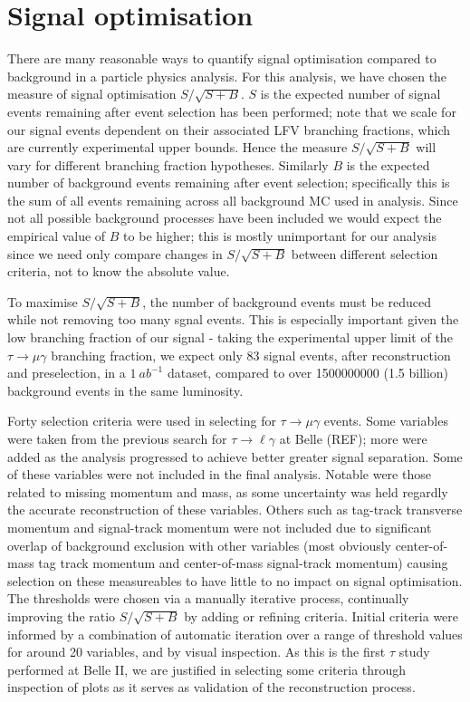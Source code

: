 \documentclass[12pt]{thesis}  %
\begin{document}

\chapter{Signal optimisation}

There are many reasonable ways to quantify signal optimisation compared to background in a particle physics analysis. For this analysis, we have chosen the measure of signal optimisation $S/\sqrt{S+B}$. $S$ is the expected number of signal events remaining after event selection has been performed; note that we scale for our signal events dependent on their associated LFV branching fractions, which are currently experimental upper bounds. Hence the measure $S/\sqrt{S+B}$ will vary for different branching fraction hypotheses. 
Similarly $B$ is the expected number of background events remaining after event selection; specifically this is the sum of all events remaining across all background MC used in analysis. Since not all possible background processes have been included we would expect the empirical value of $B$ to be higher; this is mostly unimportant for our analysis since we need only compare changes in $S/\sqrt{S+B}$ between different selection criteria, not to know the absolute value.

To maximise $S/\sqrt{S+B}$, the number of background events must be reduced while not removing too many sgnal events. This is especially important given the low branching fraction of our signal - taking the experimental upper limit of the $\tau\to\mu\gamma$ branching fraction, we expect only 83 signal events, after reconstruction and preselection, in a $\SI{1}{ab^{-1}}$ dataset, compared to over \num{1500000000} (1.5 billion) background events in the same luminosity.

Forty selection criteria were used in selecting for $\tau\to\mu\gamma$ events. Some variables were taken from the previous search for $\tau\to\ell\gamma$ at Belle (REF); more were added as the analysis progressed to achieve better greater signal separation. Some of these variables were not included in the final analysis. Notable were those related to missing momentum and mass, as some uncertainty was held regardly the accurate reconstruction of these variables. Others such as tag-track transverse momentum and signal-track momentum were not included due to significant overlap of background exclusion with other variables (most obviously center-of-mass tag track momentum and center-of-mass signal-track momentum) causing selection on these measureables to have little to no impact on signal optimisation.
The thresholds were chosen via a manually iterative process, continually improving the ratio $S/\sqrt{S+B}$ by adding or refining criteria. Initial criteria were informed by a combination of automatic iteration over a range of threshold values for around 20 variables, and by visual inspection. As this is the first $\tau$ study performed at Belle II, we are justified in selecting some criteria through inspection of plots as it serves as validation of the reconstruction process.
\end{document}
